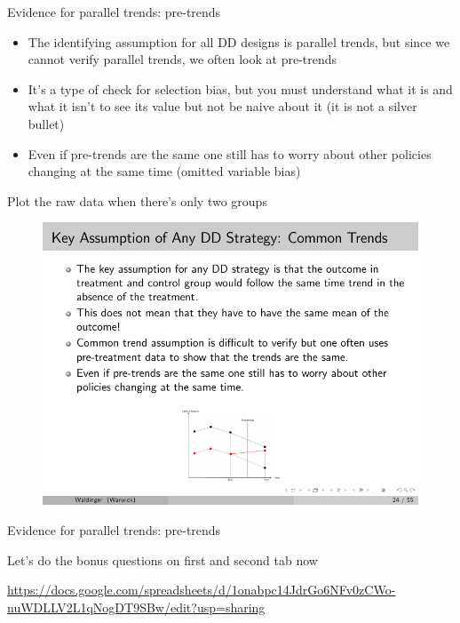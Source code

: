 \documentclass{beamer}
\begin{document}
\begin{frame}{Evidence for parallel trends: pre-trends}

\begin{itemize}

	\item The identifying assumption for all DD designs is parallel trends, but since we cannot verify parallel trends, we often look at pre-trends
	\item It's a type of check for selection bias, but you must understand what it is and what it isn't to see its value but not be naive about it (it is not a silver bullet)
	\item Even if pre-trends are the same one still has to worry about other policies changing at the same time (omitted variable bias)

\end{itemize}

\end{frame}


\begin{frame}{Plot the raw data when there's only two groups}

	\begin{figure}
	\includegraphics[scale=2.5]{./lecture_includes/waldinger_dd_6.pdf}
	\end{figure}

\end{frame}

\begin{frame}{Evidence for parallel trends: pre-trends}

Let's do the bonus questions on first and second tab now 

\url{https://docs.google.com/spreadsheets/d/1onabpc14JdrGo6NFv0zCWo-nuWDLLV2L1qNogDT9SBw/edit?usp=sharing}

\end{frame}
\end{document}
